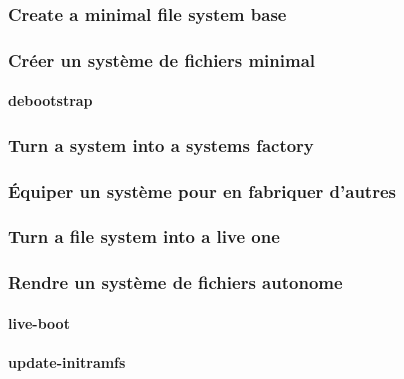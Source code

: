 \paragraph{}

\paragraph{}

\ml
{\subsubsection{Create a minimal file system base}}
{\subsubsection{Créer un système de fichiers minimal}}

\paragraph{debootstrap}

\ml
{\subsubsection{Turn a system into a systems factory}}
{\subsubsection{Équiper un système pour en fabriquer d’autres}}

\ml
{\subsubsection{Turn a file system into a live one}}
{\subsubsection{Rendre un système de fichiers autonome}}

\paragraph{live-boot}

\paragraph{update-initramfs}

